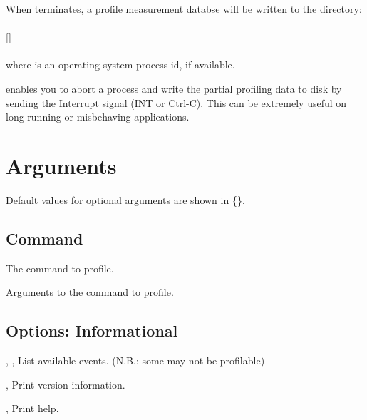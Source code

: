 \documentclass[english]{article}
\begin{document}
When  terminates, a profile measurement databse will be written to the directory:\\
\\
\SP\SP\SP {}[\Prog{-}]\\
\\
where  is an operating system process id, if available.

 enables you to abort a process and write the partial profiling data to disk by sending the Interrupt signal (INT or Ctrl-C).
This can be extremely useful on long-running or misbehaving applications.


\section{Arguments}


Default values for optional arguments are shown in \{\}.

\subsection{Command}

\begin{Description}
\item[\Arg{command}] The command to profile.

\item[\Arg{command-arguments}] Arguments to the command to profile.
\end{Description}

\subsection{Options: Informational}

\begin{Description}
\item[\Opt{-l}, \Opt{-L}, \Opt{--list-events}]
List available events. (N.B.: some may not be profilable)

\item[\Opt{-V}, \Opt{--version}]
Print version information.

\item[\Opt{-h}, \Opt{--help}]
Print help.
\end{Description}
\end{document}
